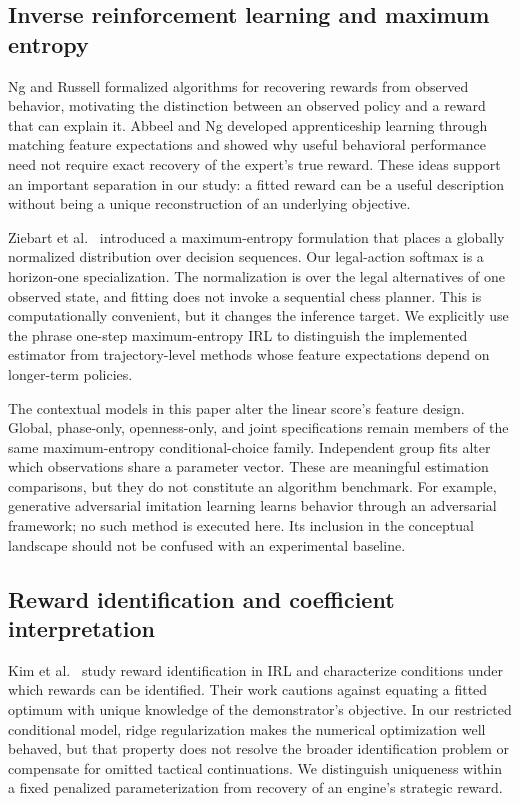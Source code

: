 \subsection{Inverse reinforcement learning and maximum entropy}
Ng and Russell \cite{ng2000} formalized algorithms for recovering rewards from observed behavior, motivating the distinction between an observed policy and a reward that can explain it. Abbeel and Ng \cite{abbeel} developed apprenticeship learning through matching feature expectations and showed why useful behavioral performance need not require exact recovery of the expert's true reward. These ideas support an important separation in our study: a fitted reward can be a useful description without being a unique reconstruction of an underlying objective.

Ziebart et al.\ \cite{ziebart} introduced a maximum-entropy formulation that places a globally normalized distribution over decision sequences. Our legal-action softmax is a horizon-one specialization. The normalization is over the legal alternatives of one observed state, and fitting does not invoke a sequential chess planner. This is computationally convenient, but it changes the inference target. We explicitly use the phrase one-step maximum-entropy IRL to distinguish the implemented estimator from trajectory-level methods whose feature expectations depend on longer-term policies.

The contextual models in this paper alter the linear score's feature design. Global, phase-only, openness-only, and joint specifications remain members of the same maximum-entropy conditional-choice family. Independent group fits alter which observations share a parameter vector. These are meaningful estimation comparisons, but they do not constitute an algorithm benchmark. For example, generative adversarial imitation learning \cite{gail} learns behavior through an adversarial framework; no such method is executed here. Its inclusion in the conceptual landscape should not be confused with an experimental baseline.

\subsection{Reward identification and coefficient interpretation}
Kim et al.\ \cite{kim} study reward identification in IRL and characterize conditions under which rewards can be identified. Their work cautions against equating a fitted optimum with unique knowledge of the demonstrator's objective. In our restricted conditional model, ridge regularization makes the numerical optimization well behaved, but that property does not resolve the broader identification problem or compensate for omitted tactical continuations. We distinguish uniqueness within a fixed penalized parameterization from recovery of an engine's strategic reward.

